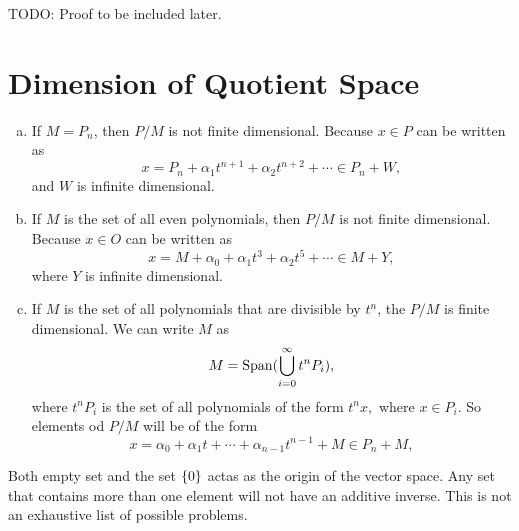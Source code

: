 \begin{problem}
	{\color{red} \noindent TODO: Proof to be included later.}
\end{problem}














\section{Dimension of Quotient Space}
\begin{problem}
	\begin{solution}
		\begin{enumerate}[(a)]
			\item If $ M = P_n $, then $ P/M $ is not finite dimensional. Because $ x \in P $ can be written as
			\[ x = P_n + \alpha_1 t^{n+1} + \alpha_2 t^{n+2} + \cdots \in P_n + W, \]
			and $ W $ is infinite dimensional.
			
			\item If $ M $ is the set of all even polynomials, then $ P/M $ is not finite dimensional. Because  $ x \in O $ can be written as
			\[ x = M + \alpha_0 + \alpha_1 t^3 + \alpha_2 t^5 + \cdots \in M + Y,  \]
			where $ Y $ is infinite dimensional.
			
			\item If $ M $ is the set of all polynomials that are divisible by $ t^n $, the $ P/M $ is finite dimensional. We can write $ M $ as
			\[ M = \operatorname{Span} (\bigcup_{i=0}^\infty t^n P_i), \]
			where $ t^nP_i $ is the set of all polynomials of the form $ t^n x, $ where $ x \in P_i $. So elements od $ P/M $ will be of the form
			\[ x = \alpha_0 + \alpha_1 t + \cdots + \alpha_{n-1}t^{n-1} + M \in P_n + M, \]
		\end{enumerate}
	\end{solution}
\end{problem}


\begin{problem}
	\begin{solution}
		Both empty set and the set $ \{0\} $ actas as the origin of the vector space. Any set that contains more than one element will not have an additive inverse. This is not an exhaustive list of possible problems.
	\end{solution}
\end{problem}


